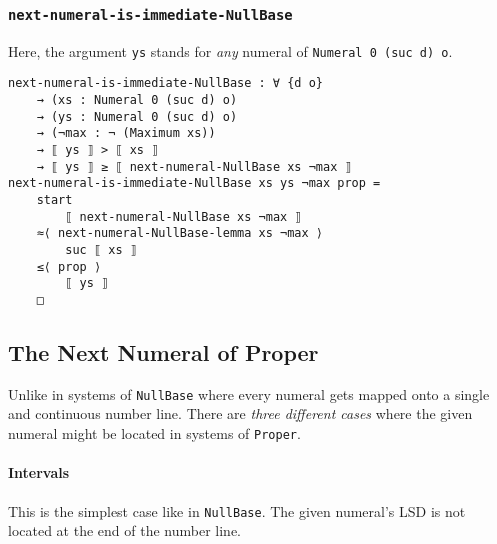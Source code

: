 \documentclass[\main/thesis.tex]{subfiles}
\begin{document}
\subsubsection{{\lstinline|next-numeral-is-immediate-NullBase|}}

Here, the argument {\lstinline|ys|} stands for \textit{any} numeral of
{\lstinline|Numeral 0 (suc d) o|}.

\begin{lstlisting}
next-numeral-is-immediate-NullBase : ∀ {d o}
    → (xs : Numeral 0 (suc d) o)
    → (ys : Numeral 0 (suc d) o)
    → (¬max : ¬ (Maximum xs))
    → ⟦ ys ⟧ > ⟦ xs ⟧
    → ⟦ ys ⟧ ≥ ⟦ next-numeral-NullBase xs ¬max ⟧
next-numeral-is-immediate-NullBase xs ys ¬max prop =
    start
        ⟦ next-numeral-NullBase xs ¬max ⟧
    ≈⟨ next-numeral-NullBase-lemma xs ¬max ⟩
        suc ⟦ xs ⟧
    ≤⟨ prop ⟩
        ⟦ ys ⟧
    □
\end{lstlisting}

\subsection{The Next Numeral of Proper}

Unlike in systems of {\lstinline|NullBase|} where every numeral gets mapped onto
a single and continuous number line.
There are \textit{three different cases} where the given numeral might be
located in systems of {\lstinline|Proper|}.

\paragraph{Intervals}

This is the simplest case like in {\lstinline|NullBase|}.
The given numeral's LSD is not located at the end of the number line.
\end{document}
